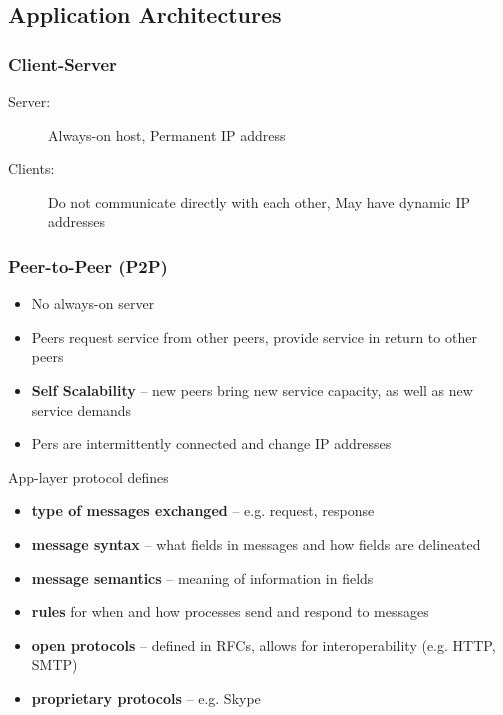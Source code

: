 \subsection{Application Architectures}
\subsubsection{Client-Server}
\begin{description}
	\item[Server:] Always-on host, Permanent IP address
	\item[Clients:] Do not communicate directly with each other, May have dynamic IP addresses
\end{description}

\subsubsection{Peer-to-Peer (P2P)}
\begin{itemize}
	\item No always-on server
	\item Peers request service from other peers, provide service in return to other peers
	\item \textbf{Self Scalability} -- new peers bring new service capacity, as well as new service demands
	\item Pers are intermittently connected and change IP addresses
\end{itemize}
\vspace{1em}
\begin{note}{App-layer protocol defines}
	\begin{itemize}
		\item \textbf{type of messages exchanged} -- e.g. request, response
		\item \textbf{message syntax} -- what fields in messages and how fields are delineated
		\item \textbf{message semantics} -- meaning of information in fields
		\item \textbf{rules} for when and how processes send and respond to messages
		\item \textbf{open protocols} -- defined in RFCs, allows for interoperability (e.g. HTTP, SMTP)
		\item \textbf{proprietary protocols} -- e.g. Skype
	\end{itemize}
\end{note}

